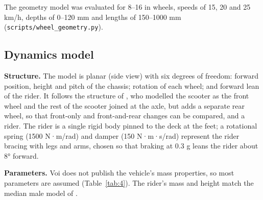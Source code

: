 The geometry model was evaluated for 8--16 in wheels, speeds of 15, 20 and 25 km/h,
depths of 0--120 mm and lengths of 150--1000 mm (\texttt{scripts/wheel\_geometry.py}).

\subsection{Dynamics model}\label{dynamics-model}

\textbf{Structure.} The model is planar (side view) with six degrees of freedom: forward
position, height and pitch of the chassis; rotation of each wheel; and forward lean of
the rider. It follows the structure of \textcite{posirisuk2022}, who modelled the scooter as the
front wheel and the rest of the scooter joined at the axle, but adds a separate rear
wheel, so that front-only and front-and-rear changes can be compared, and a rider. The
rider is a single rigid body pinned to the deck at the feet; a rotational spring
(1500 N·m/rad) and damper (150 N·m·s/rad) represent the rider bracing with legs and arms,
chosen so that braking at 0.3 g leans the rider about 8° forward.

\textbf{Parameters.} Voi does not publish the vehicle's mass properties, so most parameters
are assumed (Table~\ref{tab:4}). The rider's mass and height match the median male model of
\textcite{posirisuk2022}.

